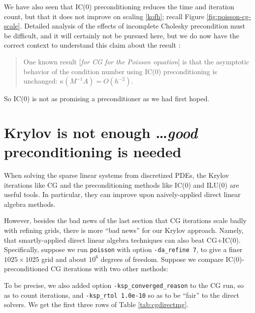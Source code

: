 We have also seen that IC($0$) preconditioning reduces the time and iteration count, but that it does not improve on scaling \eqref{kofh}; recall Figure \ref{fig:poisson-cg-scale}.  Detailed analysis of the effects of incomplete Cholesky precondition must be difficult, and it will certainly not be pursued here, but we do now have the correct context to understand this claim about the result \citet[][p.~82]{Elmanetal2005}:
\begin{quote}
One known result [\emph{for CG for the Poisson equation}] is that the asymptotic behavior of the condition number using IC($0$) preconditioning is unchanged: $\kappa(M^{-1} A) = O(h^{-2})$.
\end{quote}
So IC($0$) is not as promising a preconditioner as we had first hoped.


\section{Krylov is not enough \dots \emph{good} preconditioning is needed}

When solving the sparse linear systems from discretized PDEs, the Krylov iterations like CG and the preconditioning methods like IC($0$) and ILU($0$) are useful tools.  In particular, they can improve upon naively-applied direct linear algebra methods.

However, besides the bad news of the last section that CG iterations scale badly with refining grids, there is more ``bad news'' for our Krylov approach.  Namely, that smartly-applied direct linear algebra techniques can also beat CG+IC($0$).  Specifically, suppose we run \texttt{poisson} with option \texttt{-da\_refine 7}, to give a finer $1025 \times 1025$ grid and about $10^6$ degrees of freedom.  Suppose we compare IC($0$)-preconditioned CG iterations with two other methods:
To be precise, we also added option \texttt{-ksp\_converged\_reason} to the CG run, so as to count iterations, and \texttt{-ksp\_rtol 1.0e-10} so as to be ``fair'' to the direct solvers.  We get the first three rows of Table \ref{tab:cgdirectmg}.


